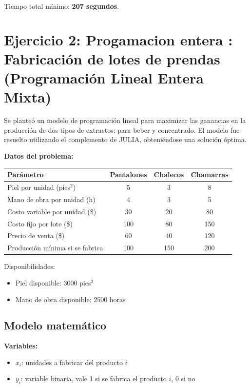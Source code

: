 \documentclass[12pt, a4paper, oneside]{book}
\theoremstyle{definition}
\begin{document}
    Tiempo total mínimo: \textbf{207 segundos}.

    \newpage
    \section{Ejercicio 2: Progamacion entera : Fabricación de lotes de prendas (Programación Lineal Entera Mixta)}

    Se planteó un modelo de programación lineal para maximizar las ganancias en la producción de dos tipos de extractos: para beber y concentrado. El modelo fue resuelto utilizando el complemento de JULIA, obteniéndose una solución óptima.

    \textbf{Datos del problema:}

    \begin{center}
    \begin{tabular}{|l|c|c|c|}
    \hline
    \textbf{Parámetro} & \textbf{Pantalones} & \textbf{Chalecos} & \textbf{Chamarras} \\
    \hline
    Piel por unidad (pies$^2$) & 5 & 3 & 8 \\
    Mano de obra por unidad (h) & 4 & 3 & 5 \\
    Costo variable por unidad (\$) & 30 & 20 & 80 \\
    Costo fijo por lote (\$) & 100 & 80 & 150 \\
    Precio de venta (\$) & 60 & 40 & 120 \\
    Producción mínima si se fabrica & 100 & 150 & 200 \\
    \hline
    \end{tabular}
    \end{center}

    Disponibilidades:
    \begin{itemize}
        \item Piel disponible: 3000 pies$^2$
        \item Mano de obra disponible: 2500 horas
    \end{itemize}

    \subsection{Modelo matemático}

    \textbf{Variables:}
    \begin{itemize}
        \item $x_i$: unidades a fabricar del producto $i$
        \item $y_i$: variable binaria, vale 1 si se fabrica el producto $i$, 0 si no
    \end{itemize}
\end{document}
